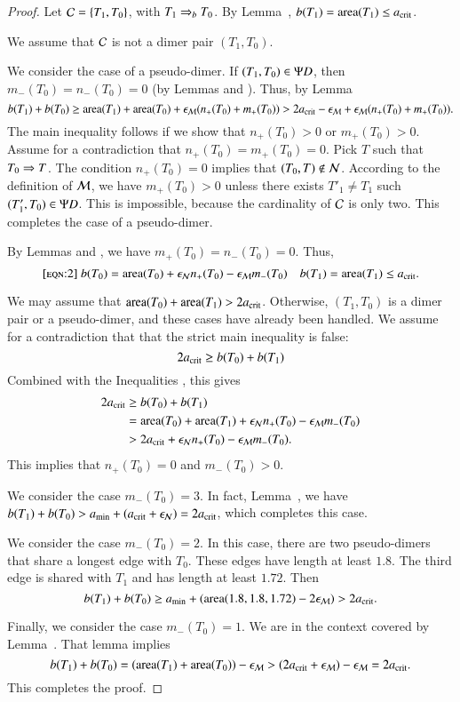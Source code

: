 \begin{proof}  
  Let $\mathcal C = \{T_1,T_0\}$, with $T_1\Rightarrow_{b} T_0$. By
  Lemma~, $b(T_1)={\operatorname{area}}(T_1)\le a_\text{crit}$.

  We assume that $\mathcal C$ is not a dimer pair $(T_1,T_0)$.

  We consider the case of a pseudo-dimer.  If $(T_1,T_0)\in\Psi D$, then
  $m_-(T_0)=n_-(T_0)=0$ (by Lemmas  and
  ).  Thus, by Lemma~
\[
b(T_1)+b(T_0) 
\ge {\operatorname{area}}(T_1)+{\operatorname{area}}(T_0) + \epsilon_{\mathcal M} (n_+(T_0) + m_+(T_0)) 
> 2a_\text{crit} - \epsilon_{\mathcal M}  + \epsilon_{\mathcal M} (n_+(T_0)+m_+(T_0)).
\]
The main inequality follows if we show that $n_+(T_0)>0$ or
$m_+(T_0)>0$.  Assume for a contradiction that $n_+(T_0)=m_+(T_0)=0$.
Pick $T$ such that $T_0\Rightarrow T$.  The condition $n_+(T_0)=0$ implies
that $(T_0,T)\not\in\mathcal N$.  According to the definition of $\mathcal M$, we have
$m_+(T_0)>0$ unless there exists $T'_1\ne T_1$ such
$(T'_1,T_0)\in\Psi D$.  This is impossible, because the cardinality of
$\mathcal C$ is only two.  This completes the case of a pseudo-dimer.

By Lemmas  and , we have
$m_+(T_0)=n_-(T_0)=0$.  Thus,
\begin{equation}\libel{eqn:2}
b(T_0) = \area(T_0) + \epsN n_+(T_0) - \epsM m_-(T_0)
\quad b(T_1) = \area(T_1) \le \acrit.
\end{equation}

We may assume that ${\operatorname{area}}(T_0)+{\operatorname{area}}(T_1)> 2a_\text{crit}$.  Otherwise,
$(T_1,T_0)$ is a dimer pair or a pseudo-dimer, and these cases have
already been handled.  
We assume for a contradiction that that the strict  main inequality
is false: 
\[
2a_\text{crit} \ge b(T_0) + b(T_1)
\]
Combined with the Inequalities ,
this gives
\begin{align*}
2a_\text{crit} &\ge b(T_0) + b(T_1) \\
&= {\operatorname{area}}(T_0) + {\operatorname{area}}(T_1) +\epsilon_{\mathcal N} n_+(T_0) - \epsilon_{\mathcal M} m_-(T_0)\\
&> 2a_\text{crit} + \epsilon_{\mathcal N} n_+(T_0) - \epsilon_{\mathcal M} m_-(T_0).
\end{align*}
This implies that $n_+(T_0)=0$ and $m_-(T_0) > 0$.

We consider the case $m_-(T_0)= 3$.  In fact, Lemma~,
we have $b(T_1) + b(T_0) > a_\text{min} + (a_\text{crit} + \epsilon_{\mathcal N}) = 2a_\text{crit}$, which
completes this case.

We consider the case $m_-(T_0)=2$.  In this case, there are two
pseudo-dimers that share a longest edge with $T_0$.  These edges have
length at least $1.8$. The third edge is shared with $T_1$ and has
length at least $1.72$.  Then
\[
b(T_1)+b(T_0) 
\ge a_\text{min} + ({\operatorname{area}} (1.8,1.8,1.72) - 2\epsilon_{\mathcal M}) > 2a_\text{crit}.
\]

Finally, we consider the case $m_-(T_0)=1$.  We are in the context
covered by Lemma~.  That lemma implies
\[
b(T_1) + b(T_0) 
= ({\operatorname{area}}(T_1) + {\operatorname{area}}(T_0)) - \epsilon_{\mathcal M} 
> (2a_\text{crit}  +\epsilon_{\mathcal M}) - \epsilon_{\mathcal M} = 2a_\text{crit}.
\]
This completes the proof.
\end{proof}

